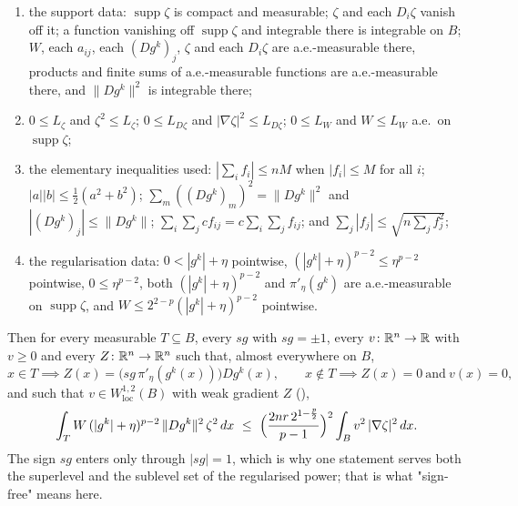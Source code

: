 \begin{helper}
\begin{enumerate}
  $x,i,j$, and, almost everywhere on $B$, both
  $\gamma_0W|\xi|^2\le\sum_{i,j}a_{ij}\xi_j\xi_i$ for every $\xi$ and
  $|a_{ij}|\le\gamma_1W$ for all $i,j$;
\item[(H6)] the support data: $\operatorname{supp}\zeta$ is compact and
  measurable; $\zeta$ and each $D_i\zeta$ vanish off it; a function vanishing
  off $\operatorname{supp}\zeta$ and integrable there is integrable on $B$;
  $W$, each $a_{ij}$, each $(Dg^k)_j$, $\zeta$ and each $D_i\zeta$ are
  a.e.-measurable there, products and finite sums of a.e.-measurable functions
  are a.e.-measurable there, and $\|Dg^k\|^2$ is integrable there;
\item[(H7)] $0\le L_\zeta$ and $\zeta^2\le L_\zeta$; $0\le L_{D\zeta}$ and
  $|\nabla\zeta|^2\le L_{D\zeta}$; $0\le L_W$ and $W\le L_W$ a.e.\ on
  $\operatorname{supp}\zeta$;
\item[(H8)] the elementary inequalities used: $|\sum_if_i|\le nM$ when
  $|f_i|\le M$ for all $i$; $|a||b|\le\tfrac12(a^2+b^2)$;
  $\sum_m((Dg^k)_m)^2=\|Dg^k\|^2$ and $|(Dg^k)_j|\le\|Dg^k\|$;
  $\sum_i\sum_jcf_{ij}=c\sum_i\sum_jf_{ij}$; and
  $\sum_j|f_j|\le\sqrt{n\sum_jf_j^2}$;
\item[(H9)] the regularisation data: $0<|g^k|+\eta$ pointwise,
  $(|g^k|+\eta)^{p-2}\le\eta^{p-2}$ pointwise, $0\le\eta^{p-2}$, both
  $(|g^k|+\eta)^{p-2}$ and $\pi'_\eta(g^k)$ are a.e.-measurable on
  $\operatorname{supp}\zeta$, and $W\le2^{2-p}(|g^k|+\eta)^{p-2}$ pointwise.
\end{enumerate}
Then for every measurable $T\subseteq B$, every $sg$ with $sg=\pm1$, every
$v\colon\mathbb{R}^n\to\mathbb{R}$ with $v\ge0$ and every $Z\colon\mathbb{R}^n\to\mathbb{R}^n$ such that,
almost everywhere on $B$,
\[
x\in T\implies Z(x)=\bigl(sg\,\pi'_\eta(g^k(x))\bigr)Dg^k(x),
\qquad
x\notin T\implies Z(x)=0\ \text{and}\ v(x)=0,
\]
and such that $v\in W^{1,2}_{\mathrm{loc}}(B)$ with weak gradient $Z$
(),
\[
\int_TW\,(|g^k|+\eta)^{p-2}\,\|Dg^k\|^2\,\zeta^2\,dx
\ \le\ \Bigl(\frac{2nr\,2^{1-\frac p2}}{p-1}\Bigr)^{2}
  \int_Bv^2\,|\nabla\zeta|^2\,dx .
\]
The sign $sg$ enters only through $|sg|=1$, which is why one statement serves
both the superlevel and the sublevel set of the regularised power; that is what
"sign-free" means here.
\end{helper}
